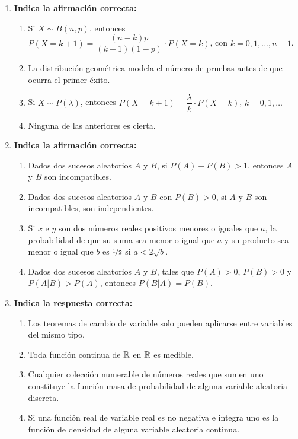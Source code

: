 \documentclass[12pt]{article}
\begin{document}
\begin{ejercicio}[3 puntos]
\begin{enumerate}[label=\arabic*.]
            \item \textbf{Indica la afirmación correcta:}
            \begin{enumerate}[label=\alph*)]
                \item Si $X \sim B(n,p)$, entonces $P(X = k + 1) = \dfrac{(n-k)p}{(k+1)(1-p)}\cdot P(X = k)$, con $k = 0,1,\dots,n-1$.
                \item La distribución geométrica modela el número de pruebas antes de que ocurra el primer éxito.
                \item Si $X \sim P(\lambda)$, entonces $P(X = k + 1) = \dfrac{\lambda}{k}\cdot P(X = k)$, $k = 0,1,\dots$
                \item Ninguna de las anteriores es cierta.
            \end{enumerate}
            
            \item \textbf{Indica la afirmación correcta:}
            \begin{enumerate}[label=\alph*)]
                \item Dados dos sucesos aleatorios $A$ y $B$, si $P(A)+P(B)>1$, entonces $A$ y $B$ son incompatibles.
                \item Dados dos sucesos aleatorios $A$ y $B$ con $P(B)>0$, si $A$ y $B$ son incompatibles, son independientes.
                \item Si $x$ e $y$ son dos números reales positivos menores o iguales que $a$, la probabilidad de que su suma sea menor o igual que $a$ y su producto sea menor o igual que $b$ es $\nicefrac{1}{2}$ si $a < 2\sqrt{b}$.
                \item Dados dos sucesos aleatorios $A$ y $B$, tales que $P(A)>0$, $P(B)>0$ y $P(A|B)>P(A)$, entonces $P(B|A)=P(B)$.
            \end{enumerate}
            
            \item \textbf{Indica la respuesta correcta:}
            \begin{enumerate}[label=\alph*)]
                \item Los teoremas de cambio de variable solo pueden aplicarse entre variables del mismo tipo.
                \item Toda función continua de $\mathbb{R}$ en $\mathbb{R}$ es medible.
                \item Cualquier colección numerable de números reales que sumen uno constituye la función masa de probabilidad de alguna variable aleatoria discreta.
                \item Si una función real de variable real es no negativa e integra uno es la función de densidad de alguna variable aleatoria continua.
            \end{enumerate}
        \end{enumerate}
    \end{ejercicio}

    \newpage
    \setcounter{ejercicio}{0} %
    \noindent
\end{document}
